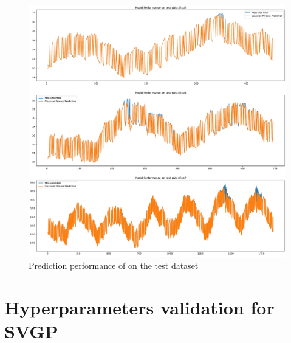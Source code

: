 \begin{figure}[ht]
    \centering
    \includegraphics[width = \textwidth]{Plots/GP_313_test_performance.pdf}
    \caption{Prediction performance of  on the test dataset}
    \label{fig:GP_313_test_validation}
\end{figure}


\clearpage

\section{Hyperparameters validation for SVGP}\label{apx:hyperparams_svgp}

\subsection{\texorpdfstring{}{123}}

